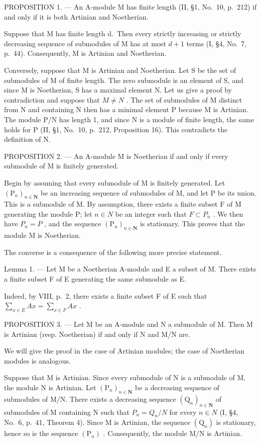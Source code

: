 PROPOSITION 1. --- An A-module M has finite length (II, §1, No.~10, p.~212) if and only if it is both Artinian and Noetherian.

Suppose that M has finite length d.~Then every strictly increasing or strictly decreasing sequence of submodules of M has at most \(d+1\) terms (I, §4, No.~7, p.~44). Consequently, M is Artinian and Noetherian.

Conversely, suppose that M is Artinian and Noetherian. Let S be the set of submodules of M of finite length. The zero submodule is an element of S, and since M is Noetherian, S has a maximal element N. Let us give a proof by contradiction and suppose that \(M \neq N\) . The set of submodules of M distinct from N and containing N then has a minimal element P because M is Artinian. The module P/N has length 1, and since N is a module of finite length, the same holds for P (II, §1, No.~10, p.~212, Proposition 16). This contradicts the definition of N.

PROPOSITION 2. --- An A-module M is Noetherian if and only if every submodule of M is finitely generated.

Begin by assuming that every submodule of M is finitely generated. Let \((\mathrm{P}_{n})_{n\in\mathbf{N}}\) be an increasing sequence of submodules of M, and let P be its union. This is a submodule of M. By assumption, there exists a finite subset F of M generating the module P; let \(n\in N\) be an integer such that \(F\subset P_{n}\) . We then have \(P_{n}=P\) , and the sequence \((\mathrm{P}_{n})_{n\in\mathbf{N}}\) is stationary. This proves that the module M is Noetherian.

The converse is a consequence of the following more precise statement.

Lemma 1. --- Let M be a Noetherian A-module and E a subset of M. There exists a finite subset F of E generating the same submodule as E.

Indeed, by VIII, p.~2, there exists a finite subset F of E such that \(\sum_{x\in E}Ax=\sum_{x\in F}Ax\) .

PROPOSITION 3. --- Let M be an A-module and N a submodule of M. Then M is Artinian (resp. Noetherian) if and only if N and M/N are.

We will give the proof in the case of Artinian modules; the case of Noetherian modules is analogous.

Suppose that M is Artinian. Since every submodule of N is a submodule of M, the module N is Artinian. Let \((\mathrm{P}_{n})_{n\in\mathbf{N}}\) be a decreasing sequence of submodules of M/N. There exists a decreasing sequence \((\mathrm{Q}_{n})_{n\in\mathbf{N}}\) of submodules of M containing N such that \(P_{n}=Q_{n}/N\) for every \(n\in N\) (I, §4, No.~6, p.~41, Theorem 4). Since M is Artinian, the sequence \((\mathrm{Q}_{n})\) is stationary, hence so is the sequence \((\mathrm{P}_{n})\) . Consequently, the module M/N is Artinian.

